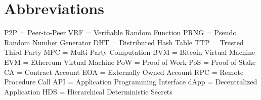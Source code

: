 \chapter*{Abbreviations}

P2P = Peer-to-Peer \newline
VRF = Verifiable Random Function \newline
PRNG = Pseudo Random Number Generator \newline
DHT = Distributed Hash Table \newline
TTP = Trusted Third Party \newline
MPC = Multi Party Computation \newline
BVM = Bitcoin Virtual Machine \newline
EVM = Ethereum Virtual Machine \newline
PoW = Proof of Work \newline
PoS = Proof of Stake \newline
CA = Contract Account \newline
EOA = Externally Owned Account \newline
RPC = Remote Procedure Call \newline
API = Application Programming Interface \newline
dApp = Decentralized Application \newline
HDS = Hierarchical Deterministic Secrets \newline